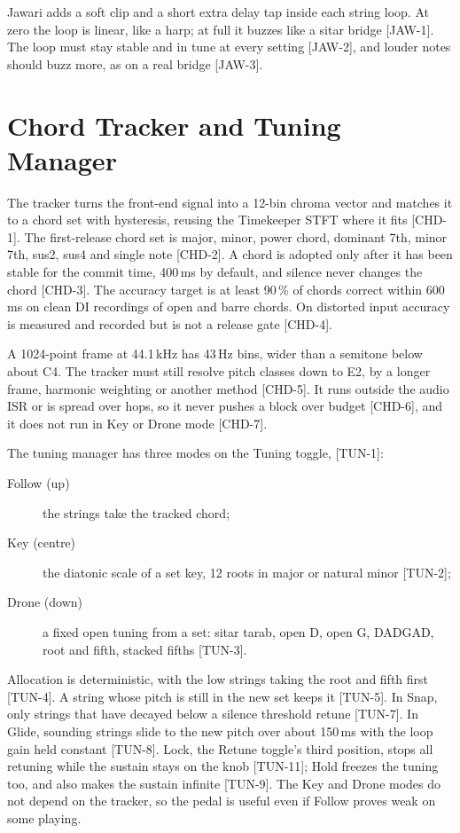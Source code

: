 Jawari adds a soft clip and a short extra delay tap inside each string loop. At zero the loop is linear, like a harp; at full it buzzes like a sitar bridge [JAW-1]. The loop must stay stable and in tune at every setting [JAW-2], and louder notes should buzz more, as on a real bridge [JAW-3].

\section{Chord Tracker and Tuning Manager}
The tracker turns the front-end signal into a 12-bin chroma vector and matches it to a chord set with hysteresis, reusing the Timekeeper STFT where it fits [CHD-1]. The first-release chord set is major, minor, power chord, dominant 7th, minor 7th, sus2, sus4 and single note [CHD-2]. A chord is adopted only after it has been stable for the commit time, 400\,ms by default, and silence never changes the chord [CHD-3]. The accuracy target is at least 90\,\% of chords correct within 600\,ms on clean DI recordings of open and barre chords. On distorted input accuracy is measured and recorded but is not a release gate [CHD-4].

A 1024-point frame at 44.1\,kHz has 43\,Hz bins, wider than a semitone below about C4. The tracker must still resolve pitch classes down to E2, by a longer frame, harmonic weighting or another method [CHD-5]. It runs outside the audio ISR or is spread over hops, so it never pushes a block over budget [CHD-6], and it does not run in Key or Drone mode [CHD-7].

The tuning manager has three modes on the Tuning toggle,  [TUN-1]:
\begin{description}
  \item[Follow (up)] the strings take the tracked chord;
  \item[Key (centre)] the diatonic scale of a set key, 12 roots in major or natural minor [TUN-2];
  \item[Drone (down)] a fixed open tuning from a set: sitar tarab, open D, open G, DADGAD, root and fifth, stacked fifths [TUN-3].
\end{description}
Allocation is deterministic, with the low strings taking the root and fifth first [TUN-4]. A string whose pitch is still in the new set keeps it [TUN-5]. In Snap, only strings that have decayed below a silence threshold retune [TUN-7]. In Glide, sounding strings slide to the new pitch over about 150\,ms with the loop gain held constant [TUN-8]. Lock, the Retune toggle's third position, stops all retuning while the sustain stays on the knob [TUN-11]; Hold freezes the tuning too, and also makes the sustain infinite [TUN-9]. The Key and Drone modes do not depend on the tracker, so the pedal is useful even if Follow proves weak on some playing.

